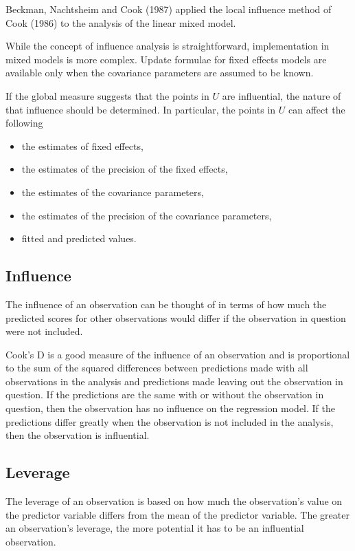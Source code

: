 \documentclass[12pt, a4paper]{article}
\begin{document}
			Beckman, Nachtsheim and Cook (1987) \citet{Beckman} applied the local influence method of Cook (1986) to the analysis of the linear mixed model.
			
			While the concept of influence analysis is straightforward, implementation in mixed models is more complex. Update formulae for fixed effects models are available only when the covariance parameters are assumed to be known.
			
			If the global measure suggests that the points in $U$ are influential, the nature of that influence should be determined. In particular, the points in $U$ can affect the following
			
			\begin{itemize}
				\item the estimates of fixed effects,
				\item the estimates of the precision of the fixed effects,
				\item the estimates of the covariance parameters,
				\item the estimates of the precision of the covariance parameters,
				\item fitted and predicted values.
			\end{itemize}
			\newpage
			
			
			
			
			\subsection{Influence}
			The influence of an observation can be thought of in terms of how much the predicted scores for other observations would differ if the observation in question were not included. 
			
			Cook's D is a good measure of the influence of an observation and is proportional to the sum of the squared differences between predictions made with all observations in the analysis and predictions made leaving out the observation in question. If the predictions are the same with or without the observation in question, then the observation has no influence on the regression model. If the predictions differ greatly when the observation is not included in the analysis, then the observation is influential.
			
			\subsection{Leverage}
			The leverage of an observation is based on how much the observation's value on the predictor variable differs from the mean of the predictor variable. The greater an observation's leverage, the more potential it has to be an influential observation. 
			
\end{document}

